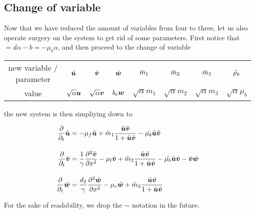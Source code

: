 \subsection{Change of variable}

Now that we have reduced the amount of variables from four to three, let us also operate surgery on the system to get rid of some parameters. First notice that $ = d\alpha - b = -\mu_b \alpha$, and then proceed to the change of variable 

\begin{center}
\begin{tabular}{cccccccc}
	new variable / parameter & $\Tilde{\bm{u}}$ & $ \Tilde{\bm{v}}$ & $ \Tilde{\bm{w}}$ & $\Tilde{m}_1 $ & $\Tilde{m}_2$ & $\Tilde{m}_3$ & $\Tilde{\mu_b}$  \\[0.8em]
	value & $\sqrt{\alpha} \bm{u}$ & $\sqrt{\alpha} \bm{v}$ & $b_e \bm{w}$ & $\sqrt{\alpha} m_1$ & $\sqrt{\alpha} m_2$ & $\sqrt{\alpha} m_3$ &  $\sqrt{\alpha} \mu_b $
\end{tabular}
\end{center}

the new system is then simpliying down to

\begin{align}
	 \dfrac{\partial}{\partial_t} \Tilde{\bm{u}} &= -\mu_f \Tilde{\bm{u}} + \Tilde{m}_1 \dfrac{ \Tilde{\bm{u}} \Tilde{\bm{v}}}{1 +  \Tilde{\bm{u}} \Tilde{\bm{v}}} - \Tilde{\mu_b} \Tilde{\bm{u}} \Tilde{ \bm{v}}  \notag \\[1em]
	\dfrac{\partial}{\partial_t} \Tilde{\bm{v}} &= \dfrac{1}{\gamma} \frac{\partial^2 \Tilde{\bm{v}}}{\partial x^2} - \mu_l  \Tilde{\bm{v}} +\Tilde{ m}_2 \dfrac{ \Tilde{\bm{u}} \Tilde{\bm{v}}}{1 +  \Tilde{\bm{u}}\Tilde{\bm{v}}} - \Tilde{\mu_b} \Tilde{ \bm{u}} \Tilde{ \bm{v}} - \Tilde{\bm{v}} \Tilde{\bm{w}}  \\[1em]
	\dfrac{\partial}{\partial_t} \Tilde{\bm{w}} &= \dfrac{d_2}{\gamma} \frac{\partial^2 \Tilde{\bm{w}}}{\partial x^2} - \mu_e\Tilde{ \bm{w}} + \Tilde{m}_3 \dfrac{\Tilde{\bm{u}}\Tilde{\bm{v}}}{1 + \Tilde{\bm{u}}\Tilde{\bm{v}}} \notag
\end{align}

For the sake of readability, we drop the $\sim$ notation in the future.



